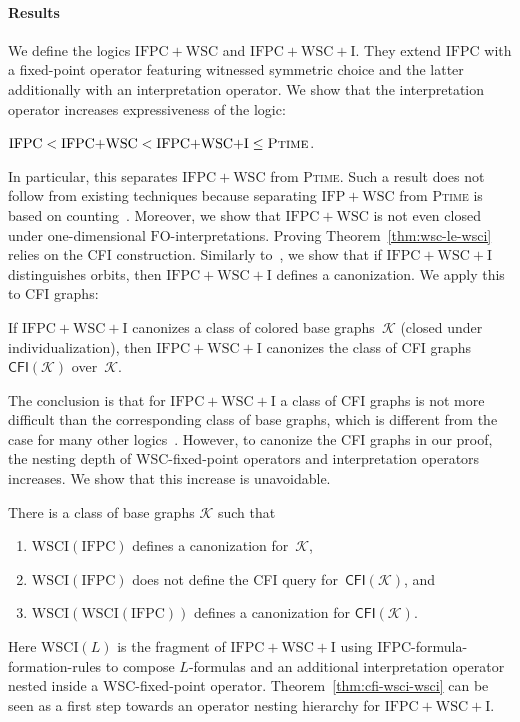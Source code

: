 \documentclass[]{lmcs}
\newcommand{\GraphClass}{\mathcal{K}}
\newcommand{\PTime}{\textsc{Ptime}}
\newcommand{\FO}{\ensuremath{\mathrm{FO}}}
\newcommand{\IFPWSC}{\ensuremath{\mathrm{IFP{+}WSC}}}
\newcommand{\IFPC}{\ensuremath{\mathrm{IFPC}}}
\newcommand{\IFPCWSC}{\ensuremath{\mathrm{IFPC{+}WSC}}}
\newcommand{\IFPCWSCI}{\ensuremath{\mathrm{IFPC{+}WSC{+}I}}}
\newcommand{\WSCIof}[1]{\mathrm{WSCI}(#1)}
\newcommand{\CFIsym}{\mathsf{CFI}}
\newcommand{\CFI}[1]{\CFIsym(#1)}
\begin{document}
\paragraph{Results}
We define the logics \IFPCWSC{} and \IFPCWSCI{}.
They extend \IFPC{} with a fixed-point operator featuring witnessed symmetric choice
and the latter additionally with an interpretation operator.
We show that the interpretation operator increases expressiveness of the logic:
\begin{thm}
	\label{thm:wsc-le-wsci}
	$\IFPC{} < \IFPCWSC{} < \IFPCWSCI{} \leq \PTime$.
\end{thm}
In particular, this separates \IFPCWSC{} from \PTime{}.
Such a result  does not follow from existing techniques
because separating \IFPWSC{} from \PTime{} is based on counting~\cite{GireHoang98}.
Moreover, we show that \IFPCWSC{} is not even closed under one-dimensional \FO{}-interpretations.
Proving Theorem~\ref{thm:wsc-le-wsci} relies on the CFI construction.
Similarly to~\cite{LichterSchweitzer24},
we show that if \IFPCWSCI{} distinguishes orbits,
then \IFPCWSCI{} defines a canonization.
We apply this to CFI graphs:
\begin{thm}
	\label{thm:canonize-CFI if-base}
	If \IFPCWSCI{} canonizes a class of colored base graphs~$\GraphClass$ (closed under individualization),
	then \IFPCWSCI{} canonizes the class of CFI graphs $\CFI{\GraphClass}$ over~$\GraphClass$.
\end{thm}
The conclusion is that for $\IFPCWSCI$ a class of CFI graphs is not more difficult than the corresponding class of base graphs,
which is different from the case for many other logics~\cite{CaiFI1992,GradelPakusa19, Lichter2023, DawarGraedelLichter22}.
However, to canonize the CFI graphs in our proof,
the nesting depth of WSC-fixed-point operators and interpretation operators increases.
We show that this increase is unavoidable.
\begin{thm}
	\label{thm:cfi-wsci-wsci}
	There is a class of base graphs $\GraphClass$ such that
	\begin{enumerate}
		\item $\WSCIof{\IFPC{}}$ defines a canonization for~$\GraphClass$,
		\item $\WSCIof{\IFPC{}}$ does not define the CFI query for~$\CFI{\GraphClass}$, and
		\item $\WSCIof{\WSCIof{\IFPC{}}}$ defines a canonization for $\CFI{\GraphClass}$.
	\end{enumerate}
\end{thm}
Here $\WSCIof{L}$ is the fragment of $\IFPCWSCI$
using \IFPC{}-formula-formation-rules to compose $L$-formulas and 
an additional interpretation operator nested inside a WSC-fixed-point operator.
Theorem~\ref{thm:cfi-wsci-wsci} can be seen as a first step
towards an operator nesting hierarchy for $\IFPCWSCI$.
\end{document}
